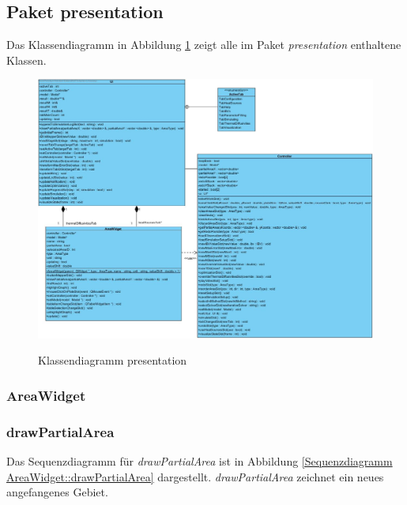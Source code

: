 \newpage
\subsection{Paket presentation}

Das Klassendiagramm in Abbildung \ref{Klassendiagramm presentation} zeigt alle im Paket \emph{presentation} enthaltene Klassen.

\begin{figure}[H]
	\centering
	\includegraphics[scale=.42]{Bilder/presentation.jpg}\\
	\caption{Klassendiagramm presentation}
	\label{Klassendiagramm presentation}
\end{figure}

\subsubsection{AreaWidget}

\subsubsection*{drawPartialArea}

Das Sequenzdiagramm für \emph{drawPartialArea} ist in Abbildung \ref{Sequenzdiagramm AreaWidget::drawPartialArea} dargestellt. \emph{drawPartialArea} zeichnet ein neues angefangenes Gebiet.

